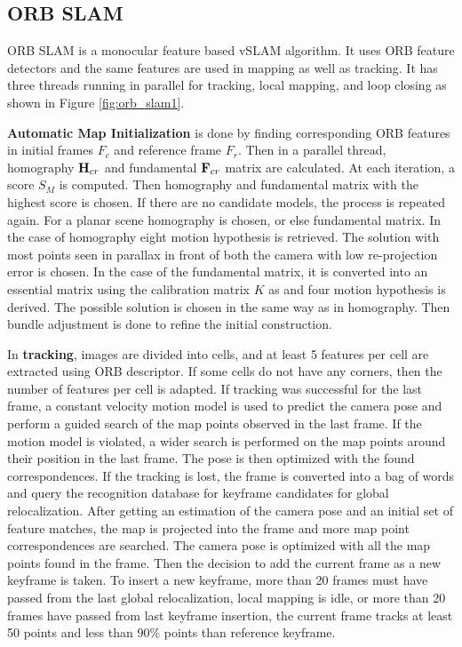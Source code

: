 \subsection{ORB SLAM}

ORB SLAM \cite{7219438} is a monocular feature based vSLAM algorithm. It uses ORB feature detectors and the same features are used in mapping as well as tracking. It has three threads running in parallel for tracking, local mapping, and loop closing as shown in Figure \ref{fig:orb_slam1}.

\textbf{Automatic Map Initialization} is done by finding corresponding ORB features in initial frames $F_c$ and reference frame $F_r$. Then in a parallel thread, homography ${\bf H}_{cr}$ and fundamental ${\bf F}_{cr}$ matrix are calculated. At each iteration, a score $S_M$ is computed. Then homography and fundamental matrix with the highest score is chosen. If there are no candidate models, the process is repeated again. For a planar scene homography is chosen, or else fundamental matrix. In the case of homography eight motion hypothesis is retrieved. The solution with most points seen in parallax in front of both the camera with low re-projection error is chosen. In the case of the fundamental matrix, it is converted into an essential matrix using the calibration matrix $K$ as and four motion hypothesis is derived. The possible solution is chosen in the same way as in homography. Then bundle adjustment is done to refine the initial construction.

In \textbf{tracking}, images are divided into cells, and at least 5 features per cell are extracted using ORB descriptor. If some cells do not have any corners, then the number of features per cell is adapted. If tracking was successful for the 	last frame, a constant velocity motion model is used to predict the camera pose and perform a guided search of the map points observed in the last frame. If the motion model is violated, a wider search is performed on the map points around their position in the last frame. The pose is then optimized with the found correspondences. If the tracking is lost, the frame is converted into a bag of words and query the recognition database for keyframe candidates for global relocalization. After getting an estimation of the camera pose and an initial set of feature matches, the map is projected into the frame and more map point correspondences are searched. The camera pose is optimized with all the map points found in the frame. Then the decision to add the current frame as a new keyframe is taken. To insert a new keyframe, more than 20 frames must have passed from the last global relocalization, local mapping is idle, or more than 20 frames have passed from last keyframe insertion, the current frame tracks at least 50 points and less than 90\% points than reference keyframe.

